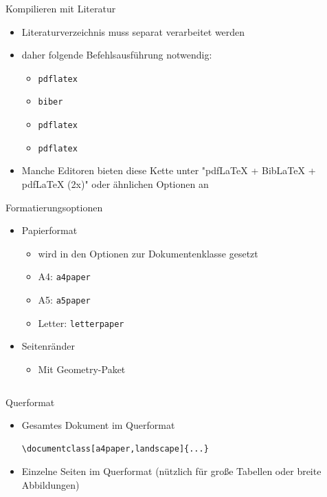 \documentclass[presentation,aspectratio=169]{beamer}
\begin{document}
\begin{frame}[fragile]{Kompilieren mit Literatur}
  \begin{itemize}
    \item Literaturverzeichnis muss separat verarbeitet werden
    \item daher folgende Befehlsausführung notwendig:
      \begin{itemize}
        \item \verb|pdflatex|
        \item \verb|biber|
        \item \verb|pdflatex|
        \item \verb|pdflatex|
      \end{itemize}
    \item Manche Editoren bieten diese Kette unter "pdf\LaTeX{} + Bib\LaTeX{} + pdf\LaTeX{} (2x)" oder ähnlichen Optionen an
  \end{itemize}
\end{frame}

\begin{frame}[fragile]{Formatierungsoptionen}
  \begin{itemize}
    \item Papierformat
      \begin{itemize}
        \item wird in den Optionen zur Dokumentenklasse gesetzt
        \item A4: \verb|a4paper|
        \item A5: \verb|a5paper|
        \item Letter: \verb|letterpaper|
      \end{itemize}
    \item Seitenränder
      \begin{itemize}
        \item Mit Geometry-Paket
          \inputminted{latex}{codebeispiele/geometry.tex}
      \end{itemize}
  \end{itemize}
\end{frame}

\begin{frame}[fragile]{Querformat}
  \begin{itemize}
    \item Gesamtes Dokument im Querformat
      \begin{verbatim}
\documentclass[a4paper,landscape]{...}
      \end{verbatim}
    \item Einzelne Seiten im Querformat (nützlich für große Tabellen oder breite Abbildungen)
      \inputminted{latex}{codebeispiele/landscape.tex}
  \end{itemize}
\end{frame}
\end{document}
